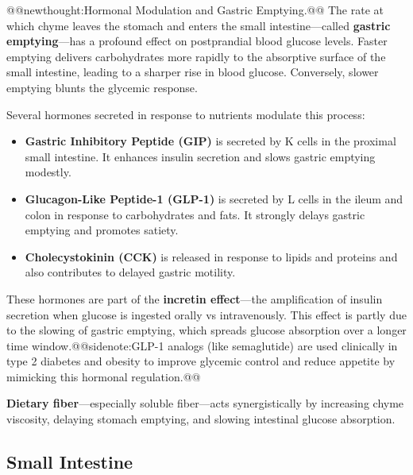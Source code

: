 \documentclass{tufte-handout}
\makeatletter
\def\newthought#1{@@newthought:#1@@}
\def\sidenote#1{@@sidenote:#1@@}
\makeatother
\begin{document}
\newthought{Hormonal Modulation and Gastric Emptying.} The rate at which chyme leaves the stomach and enters the small intestine—called \textbf{gastric emptying}—has a profound effect on postprandial blood glucose levels. Faster emptying delivers carbohydrates more rapidly to the absorptive surface of the small intestine, leading to a sharper rise in blood glucose. Conversely, slower emptying blunts the glycemic response.

Several hormones secreted in response to nutrients modulate this process:

\begin{itemize}
  \item \textbf{Gastric Inhibitory Peptide (GIP)} is secreted by K cells in the proximal small intestine. It enhances insulin secretion and slows gastric emptying modestly.
  \item \textbf{Glucagon-Like Peptide-1 (GLP-1)} is secreted by L cells in the ileum and colon in response to carbohydrates and fats. It strongly delays gastric emptying and promotes satiety.
  \item \textbf{Cholecystokinin (CCK)} is released in response to lipids and proteins and also contributes to delayed gastric motility.
\end{itemize}

These hormones are part of the \textbf{incretin effect}—the amplification of insulin secretion when glucose is ingested orally vs intravenously. This effect is partly due to the slowing of gastric emptying, which spreads glucose absorption over a longer time window.\sidenote{GLP-1 analogs (like semaglutide) are used clinically in type 2 diabetes and obesity to improve glycemic control and reduce appetite by mimicking this hormonal regulation.}

\noindent \textbf{Dietary fiber}—especially soluble fiber—acts synergistically by increasing chyme viscosity, delaying stomach emptying, and slowing intestinal glucose absorption.



\subsection{Small Intestine}
\end{document}

